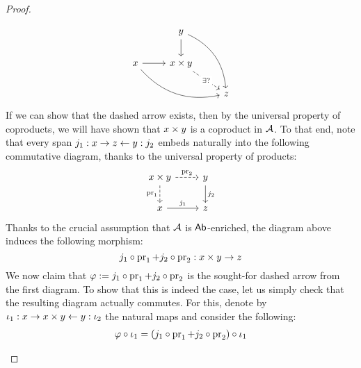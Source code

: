 \begin{proof}
\begin{enumerate}
                                    $$
                                        \begin{tikzcd}
                                                                                                    & y \arrow[d] \arrow[rdd, bend left] &   \\
                                            x \arrow[r] \arrow[rrd, bend right] & x \x y \arrow[rd, "\exists ?" description, dashed]   &   \\
                                                                                                    &                                                      & z
                                        \end{tikzcd}
                                    $$
                                If we can show that the dashed arrow exists, then by the universal property of coproducts, we will have shown that $x \x y$ is a coproduct in $\calA$. To that end, note that every span $j_1: x \to z \ot y: j_2$ embeds naturally into the following commutative diagram, thanks to the universal property of products:
                                    $$
                                        \begin{tikzcd}
                                            x \x y \arrow[d, "\pr_1"', dashed] \arrow[r, "\pr_2", dashed] & y \arrow[d, "j_2"] \\
                                            x \arrow[r, "j_1"]                                            & z                 
                                        \end{tikzcd}
                                    $$
                                Thanks to the crucial assumption that $\calA$ is $\Ab$-enriched, the diagram above induces the following morphism:
                                    $$j_1 \circ \pr_1 + j_2 \circ \pr_2: x \x y \to z$$
                                We now claim that $\varphi := j_1 \circ \pr_1 + j_2 \circ \pr_2$ is the sought-for dashed arrow from the first diagram. To show that this is indeed the case, let us simply check that the resulting diagram actually commutes. For this, denote by $\iota_1: x \to x \x y \ot y: \iota_2$ the natural maps and consider the following:
                                    $$
                                        \begin{aligned}
                                            \varphi \circ \iota_1 & = (j_1 \circ \pr_1 + j_2 \circ \pr_2) \circ \iota_1
                                            \\

\end{aligned}$$
\end{enumerate}
\end{proof}
